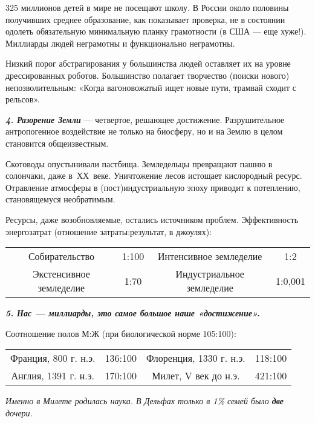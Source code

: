 325 миллионов детей в мире не посещают школу. В России около половины получивших среднее образование, как показывает
проверка, не в состоянии одолеть обязательную минимальную планку грамотности (в США — еще хуже!). Миллиарды людей
неграмотны и функционально неграмотны.


Низкий порог абстрагирования у большинства людей оставляет их на уровне дрессированных роботов. Большинство полагает
творчество (поиски нового) непозволительным: «Когда вагоновожатый ищет новые пути, трамвай сходит с рельсов».


\textbf{\textit{4. Разорение Земли }}— четвертое, решающее достижение. Разрушительное антропогенное воздействие не
только на биосферу, но и на Землю в целом становится общеизвестным.


Скотоводы опустынивали пастбища. Земледельцы превращают пашню в солончаки, даже в~ХХ~веке. Уничтожение лесов истощает
кислородный ресурс. Отравление атмосферы в (пост)индустриальную эпоху приводит к
\flqq потеплению\frqq, становящемуся необратимым.


Ресурсы, даже возобновляемые, остались источником проблем. Эффективность энергозатрат (отношение затраты:результат, в
джоулях):


\bigskip

\begin{center}
\tablefirsthead{}
\tablehead{}
\tabletail{}
\tablelasttail{}
\begin{supertabular}{cccc}
 Собирательство  &  1:100 &  Интенсивное земледелие &  1:2 \\
 Экстенсивное земледелие &  1:70 &  Индустриальное земледелие &  1:0,001 \\
\end{supertabular}
\end{center}

\bigskip


\textbf{\textit{5. Нас — миллиарды, это самое большое наше «достижение».}}


Соотношение полов М:Ж (при биологической норме 105:100):


\bigskip

\begin{center}
\tablefirsthead{}
\tablehead{}
\tabletail{}
\tablelasttail{}
\begin{supertabular}{cccc}
 Франция, 800 г. н.э. &  136:100 &  Флоренция, 1330 г. н.э. &  118:100 \\
 Англия, 1391 г. н.э. &  170:100 & Милет, V век до н.э. &  421:100 \\
\end{supertabular}
\end{center}
{\itshape
    Именно в Милете родилась наука. В Дельфах только в 1\% семей было
\textbf{две} дочери.}


